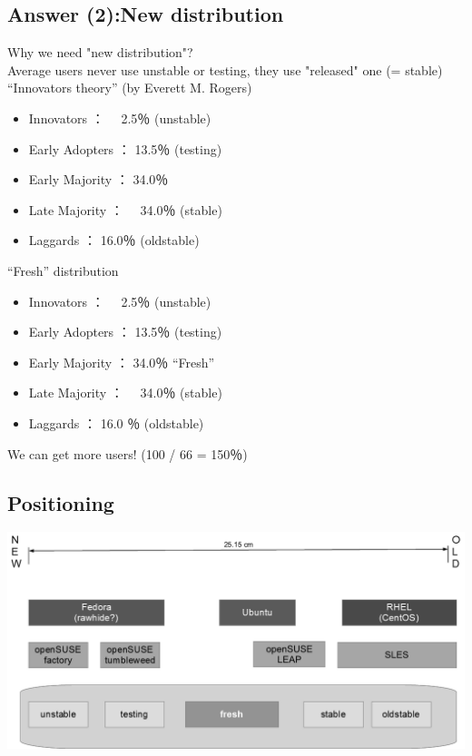 \documentclass[mingoth,a4paper]{jsarticle}
\begin{document}
\subsection{Answer (2):New distribution}
\noindent
Why we need "new distribution"?
\\
Average users never use unstable or testing, they use "released" one (= stable)
\\
“Innovators theory” (by Everett M. Rogers)
\\
\begin{itemize}
 \item Innovators			：　	 2.5％	(unstable)
 \item Early Adopters		：		13.5％	(testing)
 \item Early Majority		：		34.0％
 \item Late Majority		：　	34.0％	(stable)
 \item Laggards			： 		16.0％	(oldstable)
\end{itemize}

“Fresh” distribution
\begin{itemize}
 \item Innovators		：　	 2.5％		(unstable)
 \item Early Adopters	：		13.5％		(testing)
 \item Early Majority	：		34.0％		“Fresh”
 \item Late Majority	：　	34.0％		(stable)
 \item Laggards			： 	16.0 ％		(oldstable)
\end{itemize}
We can get more users! (100 / 66 = 150％)
\\
\subsection{Positioning}

\includegraphics[width=\linewidth]{image201711-tokyo/Rethinking-debian-release-p13_gray.png}
\end{document}

